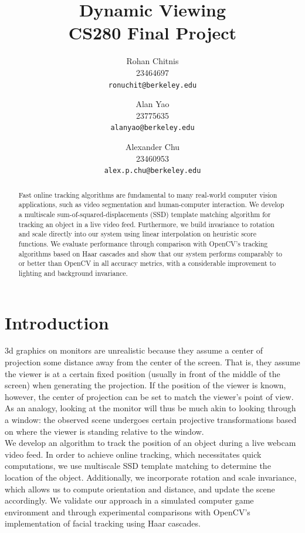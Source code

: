 \documentclass[10pt,twocolumn,letterpaper]{article}
\begin{document}
\title{Dynamic Viewing\\CS280 Final Project}

\author{Rohan Chitnis\\
23464697\\
{\tt\small ronuchit@berkeley.edu}
\and
Alan Yao\\
23775635\\
{\tt\small alanyao@berkeley.edu}
\and
Alexander Chu\\
23460953\\
{\tt\small alex.p.chu@berkeley.edu}
}

\maketitle

\begin{abstract}
  Fast online tracking algorithms are fundamental to many real-world computer
  vision applications, such as video segmentation and human-computer interaction.
  We develop a multiscale sum-of-squared-displacements (SSD) template matching algorithm for
  tracking an object in a live video feed. Furthermore, we build invariance
  to rotation and scale directly into our system using linear interpolation on heuristic
  score functions. We evaluate performance through comparison with OpenCV's tracking
  algorithms based on Haar cascades \cite{haarcascade} and show that our system performs comparably to or
  better than OpenCV in all accuracy metrics, with a considerable improvement to
  lighting and background invariance.
\end{abstract}

\section{Introduction}
3d graphics on monitors are unrealistic because they assume a center of projection
some distance away from the center of the screen. That is, they assume the viewer
is at a certain fixed position (usually in front of the middle of the screen) when
generating the projection. If the position of the viewer is known, however, the
center of projection can be set to match the viewer's point of view. As an analogy,
looking at the monitor will thus be much akin to looking through a window: the observed
scene undergoes certain projective transformations based on where the viewer is standing
relative to the window.\\

We develop an algorithm to track the position of an object
during a live webcam video feed. In order to achieve online tracking, which necessitates
quick computations, we use multiscale SSD template matching to determine the location of
the object. Additionally, we incorporate rotation and scale invariance, which allows us to
compute orientation and distance, and update the scene accordingly. We validate our
approach in a simulated computer game environment and through experimental comparisons
with OpenCV's implementation of facial tracking using Haar cascades.
\end{document}

